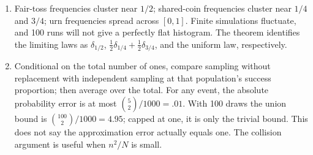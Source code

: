 \begin{enumerate}
  \[
  0\le\Var\left(\sum_{i=1}^N X_i\right)=Nv+N(N-1)c.
  \]
  Divide by $N(N-1)$ to obtain the bound. The always-disagreeing
  pair has $v=1/4,c=-1/4$, so an exchangeable extension would require
  $-1/4\ge-1/[4(N-1)]$, possible only for $N\le2$.
  \item Fair-toss frequencies cluster near $1/2$; shared-coin
  frequencies cluster near $1/4$ and $3/4$; urn frequencies spread
  across $[0,1]$. Finite simulations fluctuate, and 100 runs will not
  give a perfectly flat histogram. The theorem identifies the limiting
  laws as $\delta_{1/2}$, $\tfrac12\delta_{1/4}+\tfrac12\delta_{3/4}$,
  and the uniform law, respectively.
  \item Conditional on the total number of ones, compare sampling
  without replacement with independent sampling at that population's
  success proportion; then average over the total. For any event,
  the absolute probability error is at most
  $\binom52/1000=.01$. With 100 draws the union bound is
  $\binom{100}{2}/1000=4.95$; capped at one, it is only the trivial
  bound. This does not say the approximation error actually equals
  one. The collision argument is useful when $n^2/N$ is small.
\end{enumerate}
